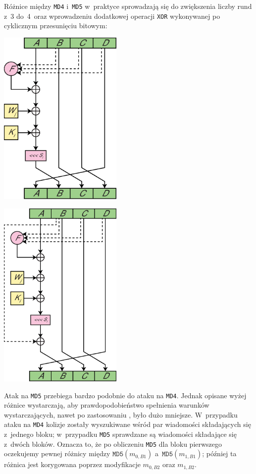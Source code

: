 \documentclass[12pt,a4paper,twoside]{article}
\begin{document}
Różnice między \texttt{MD4} i~\texttt{MD5} w~praktyce sprowadzają się do
zwiększenia liczby rund z~3 do~4~oraz wprowadzeniu dodatkowej operacji
\texttt{XOR} wykonywanej po cyklicznym przesunięciu bitowym:
\begin{multicols}{2}
\begingroup
    \centering
    \includegraphics[width=6cm]{img/md4_operation.eps}
    \label{fig:md4_operation}
\endgroup

\begingroup
    \centering
    \includegraphics[width=6cm]{img/md5_operation.eps}
    \label{fig:md5_operation}
\endgroup
\end{multicols}


Atak na \texttt{MD5} przebiega bardzo podobnie do ataku na \texttt{MD4}. Jednak
opisane wyżej różnice wystarczają, aby prawdopodobieństwo spełnienia warunków
wystarczających, nawet po zastosowaniu , było
dużo mniejsze. W~przypadku ataku na \texttt{MD4} kolizje zostały wyszukiwane
wśród par wiadomości składających się z~jednego bloku; w~przypadku \texttt{MD5}
sprawdzane są wiadomości składające się z~dwóch bloków. Oznacza to, że po
obliczeniu \texttt{MD5} dla bloku pierwszego oczekujemy pewnej różnicy między
$\mathtt{MD5}(m_{0,B1})$ a~$\mathtt{MD5}(m_{1,B1})$; później ta różnica jest
korygowana poprzez modyfikacje $m_{0,B2}$ oraz $m_{1,B2}$.
\end{document}
